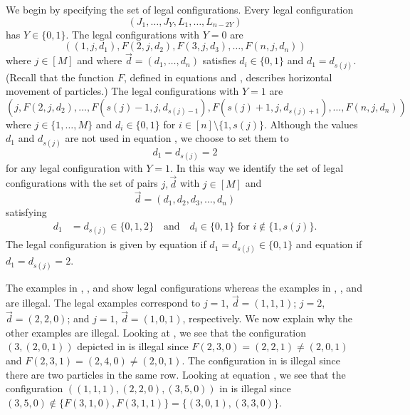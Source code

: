 \documentclass[../thesis-main/thesis-main]{subfiles}
\begin{document}
We begin by specifying the set of legal configurations. Every legal configuration 
\begin{equation}
(J_{1},\ldots,J_{Y},L_{1},\ldots,L_{n-2Y})
\end{equation}
has $Y\in\{0,1\}$. The legal configurations with $Y=0$ are 
\begin{equation}
((1,j,d_{1}),F(2,j,d_{2}),F(3,j,d_{3}),\ldots,F(n,j,d_{n}))\label{eq:config_c01}
\end{equation}
where $j\in[M]$ and where $\vec{d}=\left(d_{1},\ldots,d_{n}\right)$ satisfies $d_{i}\in\{0,1\}$ and $d_{1}=d_{s(j)}$. (Recall that the function $F$, defined in equations  and , describes horizontal movement of particles.) The legal configurations with $Y=1$ are 
\begin{equation}
(j,F(2,j,d_{2}),\ldots,F(s(j)-1,j,d_{s(j)-1}),F(s(j)+1,j,d_{s(j)+1}),\ldots,F(n,j,d_{n}))\label{eq:config_2}
\end{equation}
where $j\in\{1,\ldots,M\}$ and $d_{i}\in\{0,1\}$ for $i\in[n]\setminus\{1,s(j)\}$. Although the values $d_{1}$ and $d_{s(j)}$ are not used in equation , we choose to set them to 
\begin{equation}
d_{1}=d_{s(j)}=2
\end{equation}
for any legal configuration with $Y=1$. In this way we identify the set of legal configurations with the set of pairs $j,\vec{d}$ with $j\in[M]$ and 
\begin{equation}
\vec{d}=(d_{1},d_{2},d_{3},\ldots,d_{n})
\end{equation}
satisfying 
\begin{align}
d_{1} & =d_{s(j)}\in\{0,1,2\} \quad \text{and} \quad d_{i}\in\{0,1\} \text{ for } i\notin\{1,s(j)\}.
\end{align}
The legal configuration is given by equation  if $d_{1}=d_{s(j)}\in\{0,1\}$ and equation  if $d_{1}=d_{s(j)}=2$. 

The examples in , , and  show legal configurations whereas the examples in , , and  are illegal.  The legal examples correspond to $j=1$, $\vec d=(1,1,1)$; $j=2$, $\vec d=(2,2,0)$; and $j=1$, $\vec d=(1,0,1)$, respectively.  We now explain why the other examples are illegal. Looking at , we see that the configuration $(3,(2,0,1))$ depicted in  is illegal since $F(2,3,0)=(2,2,1) \neq (2,0,1)$ and $F(2,3,1)=(2,4,0) \neq (2,0,1)$. The configuration in  is illegal since there are two particles in the same row. Looking at equation , we see that the configuration $((1,1,1),(2,2,0),(3,5,0))$ in  is illegal since $(3,5,0)\notin \{F(3,1,0),F(3,1,1)\} = \{(3,0,1),(3,3,0)\}$.
\end{document}
